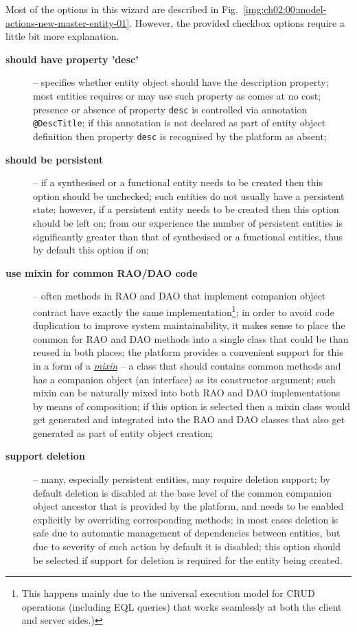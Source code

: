   Most of the options in this wizard are described in Fig.~\ref{img:ch02:00:model-actions-new-master-entity-01}.
  However, the provided checkbox options require a little bit more explanation.
  \begin{description}
   \item[\textbf{should have property 'desc'}] -- 
   specifies whether entity object should have the description property; most entities requires or may use such property as comes at no cost; 
   presence or absence of property \texttt{desc} is controlled via annotation \texttt{@DescTitle}; 
   if this annotation is not declared as part of entity object definition then property \texttt{desc} is recognised by the platform as absent;

   \item[\textbf{should be persistent}] -- 
   if a synthesised or a functional entity needs to be created then this option should be unchecked; such entities do not usually have a persistent state; 
   however, if a persistent entity needs to be created then this option should be left on; from our experience the number of persistent entities is significantly greater than that of synthesised or a functional entities, thus by default this option if on;

   \item[\textbf{use mixin for common RAO/DAO code}] -- 
   often methods in RAO and DAO that implement companion object contract have exactly the same implementation\footnote{This happens mainly due to the universal execution model for CRUD operations (including EQL queries) that works seamlessly at both the client and server sides.)}; 
   in order to avoid code duplication to improve system maintainability, it makes sense to place the common for RAO and DAO methods into a single class that could be than reused in both places; 
   the platform provides a convenient support for this in a form of a \emph{\href{http://en.wikipedia.org/wiki/Mixin}{mixin}} -- a class that should contains common methods and has a companion object (an interface) as its constructor argument; such mixin can be naturally mixed into both RAO and DAO implementations by means of composition; 
   if this option is selected then a mixin class would get generated and integrated into the RAO and DAO classes that also get generated as part of entity object creation;

   \item[\textbf{support deletion}] -- 
   many, especially persistent entities, may require deletion support; 
   by default deletion is disabled at the base level of the common companion object ancestor that is provided by the platform, and needs to be enabled explicitly by overriding corresponding methods; 
   in most cases deletion is safe due to automatic management of dependencies between entities, but due to severity of such action by default it is disabled; 
   this option should be selected if support for deletion is required for the entity being created.
  \end{description}
 
